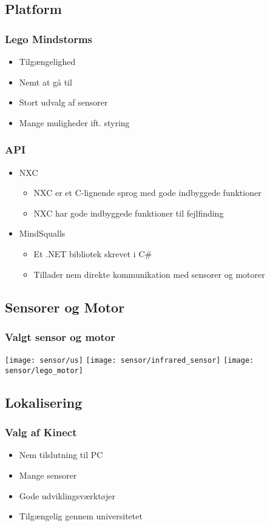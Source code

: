 \subsection{Platform}
\begin{frame}
\frametitle{Lego Mindstorms}
\begin{itemize}
\item Tilgængelighed
\item Nemt at gå til
\item Stort udvalg af sensorer
\item Mange muligheder ift. styring
\end{itemize}
\end{frame}

\begin{frame}
\frametitle{API}
\begin{itemize}
\item NXC
\begin{itemize}
\item NXC er et C-lignende sprog med gode indbyggede funktioner
\item NXC har gode indbyggede funktioner til fejlfinding
\end{itemize}
\item MindSqualls
\begin{itemize}
\item Et .NET bibliotek skrevet i C\#
\item Tillader nem direkte kommunikation med sensorer og motorer
\end{itemize}
\end{itemize}
\end{frame}
\subsection{Sensorer og Motor}
\frametitle{Valgt sensor og motor}
\begin{frame}
\texttt{[image: sensor/us]}
\texttt{[image: sensor/infrared\_sensor]}
\texttt{[image: sensor/lego\_motor]}
\end{frame}
\subsection{Lokalisering}
\begin{frame}
\frametitle{Valg af Kinect}
\begin{itemize}
\item Nem tilslutning til PC
\item Mange sensorer
\item Gode udviklingsværktøjer
\item Tilgængelig gennem universitetet
\end{itemize}
\end{frame}
